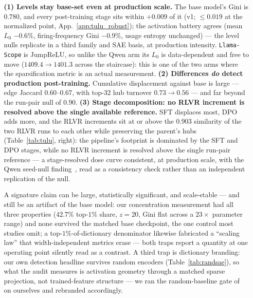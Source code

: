 \documentclass{article}
\begin{document}
\textbf{(1) Levels stay base-set even at production scale.} The base model's Gini is $0.780$, and every post-training stage sits within $+0.009$ of it (v1; $\le0.019$ at the normalized point, App.~\ref{app:tulu_robust}); the activation battery agrees (mean $L_0$ $-0.6\%$, firing-frequency Gini $-0.9\%$, usage entropy unchanged) --- the level nulls replicate in a third family and SAE basis, at production intensity. \texttt{Llama-Scope} is JumpReLU, so unlike the Qwen arm its $L_0$ is data-dependent and free to move ($1409.4\to1401.3$ across the staircase): this is one of the two arms where the sparsification metric is an actual measurement. \textbf{(2) Differences \emph{do} detect production post-training.} Cumulative displacement against base is large --- edge Jaccard $0.60$--$0.67$, with top-$32$ hub turnover $0.73\to0.56$ --- and far beyond the run-pair null of $0.90$. \textbf{(3) Stage decomposition: no RLVR increment is resolved above the single available reference.} SFT displaces most, DPO adds more, and the RLVR increments sit at or above the $0.903$ similarity of the two RLVR runs to each other while preserving the parent's hubs (Table~\ref{tab:tulu}, right): the pipeline's footprint is dominated by the SFT and DPO stages, while no RLVR increment is resolved above the single run-pair reference --- a stage-resolved dose curve consistent, at production scale, with the Qwen seed-null finding~\citep{yue2025,venhoff2026base_reason}, read as a consistency check rather than an independent replication of the null.



A signature claim can be large, statistically significant, and scale-stable --- and still be an artifact of the base model: our concentration measurement had all three properties ($42.7\%$ top-$1\%$ share, $z=20$, Gini flat across a $23\times$ parameter range) and none survived the matched base checkpoint, the one control most studies omit; a top-$1\%$-of-dictionary denominator likewise fabricated a ``scaling law'' that width-independent metrics erase --- both traps report a quantity at one operating point silently read as a contrast. A third trap is dictionary branding: our own detection headline survives random encoders (Table~\ref{tab:randsae}), so what the audit measures is activation geometry through a matched sparse projection, not trained-feature structure --- we ran the random-baseline gate of \citet{korznikov2026sanity} on ourselves and rebranded accordingly.
\end{document}
